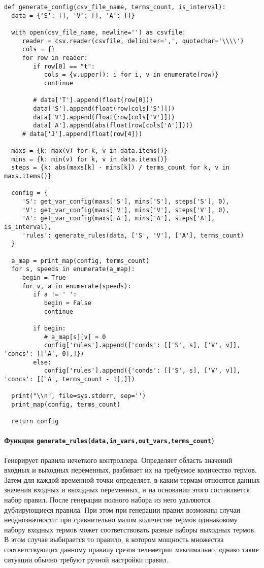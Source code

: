 \begin{lstlisting}[style=pythonstyle,caption={  }, label=lst:func:1]
  def generate_config(csv_file_name, terms_count, is_interval):
  data = {'S': [], 'V': [], 'A': []}

  with open(csv_file_name, newline='') as csvfile:
     reader = csv.reader(csvfile, delimiter=',', quotechar='\\\\')
     cols = {}
     for row in reader:
        if row[0] == "t":
           cols = {v.upper(): i for i, v in enumerate(row)}
           continue

        # data['T'].append(float(row[0]))
        data['S'].append(float(row[cols['S']]))
        data['V'].append(float(row[cols['V']]))
        data['A'].append(abs(float(row[cols['A']])))
     # data['J'].append(float(row[4]))

  maxs = {k: max(v) for k, v in data.items()}
  mins = {k: min(v) for k, v in data.items()}
  steps = {k: abs(maxs[k] - mins[k]) / terms_count for k, v in maxs.items()}

  config = {
     'S': get_var_config(maxs['S'], mins['S'], steps['S'], 0),
     'V': get_var_config(maxs['V'], mins['V'], steps['V'], 0),
     'A': get_var_config(maxs['A'], mins['A'], steps['A'], is_interval),
     'rules': generate_rules(data, ['S', 'V'], ['A'], terms_count)
  }

  a_map = print_map(config, terms_count)
  for s, speeds in enumerate(a_map):
     begin = True
     for v, a in enumerate(speeds):
        if a != ' ':
           begin = False
           continue

        if begin:
           # a_map[s][v] = 0
           config['rules'].append({'conds': [['S', s], ['V', v]], 'concs': [['A', 0],]})
        else:
           config['rules'].append({'conds': [['S', s], ['V', v]], 'concs': [['A', terms_count - 1],]})

  print("\\n", file=sys.stderr, sep='')
  print_map(config, terms_count)

  return config
\end{lstlisting}

\paragraph{Функция \lstinline!generate_rules(data,in_vars,out_vars,terms_count!)}

Генерирует правила нечеткого контроллера. Определяет область значений входных и выходных переменных, разбивает их на требуемое количество термов. Затем для каждой временной точки определяет, в каким термам относятся данных значения входных и выходных переменных, и на основании этого составляется набор правил. После генерации полного набора из него удаляются дублирующиеся правила. При этом при генерации правил возможны случаи неоднозначности: при сравнительно малом количестве термов одинаковому набору входных термов может соответствовать разные наборы выходных термов. В этом случае выбирается то правило, в котором мощность множества соответствующих данному правилу срезов телеметрии максимально, однако такие ситуации обычно требуют ручной настройки правил.


